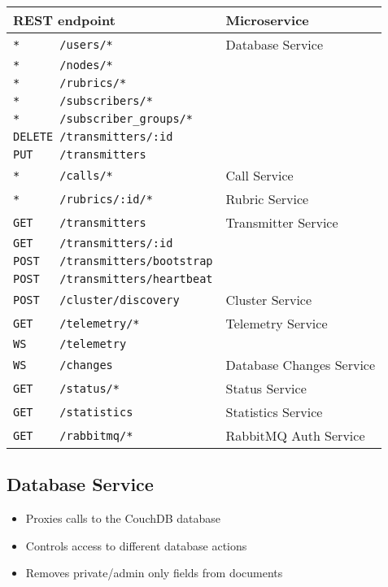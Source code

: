 \begin{center}
  \begin{tabular}{|l|l|} \hline
    REST endpoint & Microservice \\ \hline \hline

    \verb|*      /users/*| & Database Service \\
    \verb|*      /nodes/*| &  \\
    \verb|*      /rubrics/*| &  \\
    \verb|*      /subscribers/*| & \\
    \verb|*      /subscriber_groups/*| & \\
    \verb|DELETE /transmitters/:id| & \\
    \verb|PUT    /transmitters| & \\ \hline

    \verb|*      /calls/*| & Call Service \\ \hline

    \verb|*      /rubrics/:id/*| & Rubric Service \\ \hline

    \verb|GET    /transmitters| & Transmitter Service \\
    \verb|GET    /transmitters/:id| & \\
    \verb|POST   /transmitters/bootstrap| & \\
    \verb|POST   /transmitters/heartbeat| & \\ \hline

    \verb|POST   /cluster/discovery| & Cluster Service \\ \hline

    \verb|GET    /telemetry/*| & Telemetry Service \\ \hline
    \verb|WS     /telemetry| & \\ \hline

    \verb|WS     /changes| & Database Changes Service \\ \hline

    \verb|GET    /status/*| & Status Service \\ \hline

    \verb|GET    /statistics| & Statistics Service \\ \hline

    \verb|GET    /rabbitmq/*| & RabbitMQ Auth Service \\ \hline
  \end{tabular}
\end{center}

\subsection{Database Service}
\begin{itemize}
\item Proxies calls to the CouchDB database
\item Controls access to different database actions
\item Removes private/admin only fields from documents
\end{itemize}

